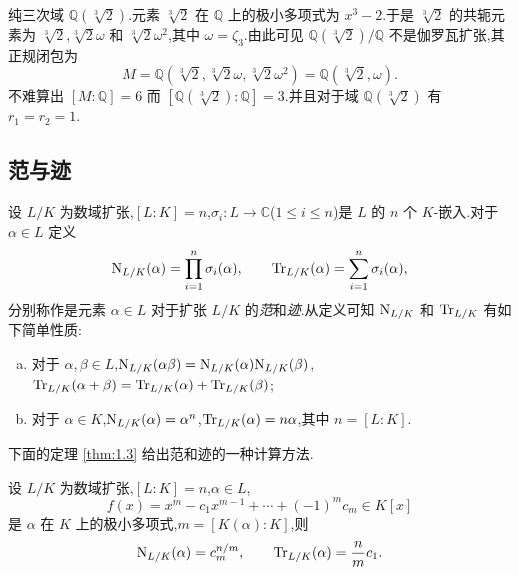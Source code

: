 \begin{example}\label{ex:ch1-1-3}
纯三次域 $\mathbb{Q}(\sqrt[3]{2})$.元素 $\sqrt[3]{2}$ 在 $\mathbb{Q}$ 上的极小多项式为 $x^3-2$.于是 $\sqrt[3]{2}$ 的共轭元素为 $\sqrt[3]{2}$,$\sqrt[3]{2}\omega$ 和 $\sqrt[3]{2}\omega^2$,其中 $\omega=\zeta_3$.由此可见 $\mathbb{Q}(\sqrt[3]{2})/\mathbb{Q}$ 不是伽罗瓦扩张,其正规闭包为
\[
  M=\mathbb{Q}(\sqrt[3]{2},\sqrt[3]{2}\omega,\sqrt[3]{2}\omega^2)=\mathbb{Q}(\sqrt[3]{2},\omega).
\]
不难算出 $[M:\mathbb{Q}]=6$ 而 $[\mathbb{Q}(\sqrt[3]{2}):\mathbb{Q}]=3$.并且对于域 $\mathbb{Q}(\sqrt[3]{2})$ 有 $r_1=r_2=1$.
\end{example}

\subsection{范与迹}\label{sec:ch1-s1-3}

设 $L/K$ 为数域扩张,$[L:K]=n$,$\sigma_i\colon L\to\mathbb{C}$($1\leqslant i\leqslant n$)是 $L$ 的 $n$ 个 $K$-嵌入.对于 $\alpha\in L$ 定义
\[
  \mathrm{N}_{L/K}(\alpha)=\prod_{i=1}^{n}\sigma_i(\alpha),\qquad
  \mathrm{Tr}_{L/K}(\alpha)=\sum_{i=1}^{n}\sigma_i(\alpha),
\]
分别称作是元素 $\alpha\in L$ 对于扩张 $L/K$ 的\emph{范}和\emph{迹}.从定义可知 $\mathrm{N}_{L/K}$ 和 $\mathrm{Tr}_{L/K}$ 有如下简单性质:
\begin{enumerate}[(a)]
  \item 对于 $\alpha,\beta\in L$,$\mathrm{N}_{L/K}(\alpha\beta)=\mathrm{N}_{L/K}(\alpha)\mathrm{N}_{L/K}(\beta)$,$\mathrm{Tr}_{L/K}(\alpha+\beta)=\mathrm{Tr}_{L/K}(\alpha)+\mathrm{Tr}_{L/K}(\beta)$;
  \item 对于 $\alpha\in K$,$\mathrm{N}_{L/K}(\alpha)=\alpha^n$,$\mathrm{Tr}_{L/K}(\alpha)=n\alpha$,其中 $n=[L:K]$.
\end{enumerate}

下面的定理 \ref{thm:1.3} 给出范和迹的一种计算方法.

\begin{theorem}\label{thm:1.3}
设 $L/K$ 为数域扩张,$[L:K]=n$,$\alpha\in L$,
\[
  f(x)=x^m-c_1x^{m-1}+\cdots+(-1)^mc_m\in K[x]
\]
是 $\alpha$ 在 $K$ 上的极小多项式,$m=[K(\alpha):K]$,则
\[
  \mathrm{N}_{L/K}(\alpha)=c_m^{n/m},\qquad
  \mathrm{Tr}_{L/K}(\alpha)=\frac{n}{m}c_1.
\]
\end{theorem}

